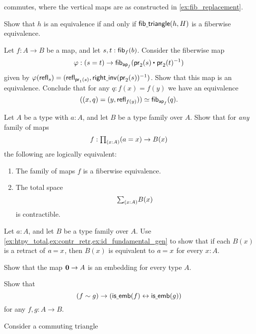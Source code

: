 \begin{exercises}
\begin{subexenum}
\begin{equation*}
\end{equation*}
commutes, where the vertical maps are as constructed in \cref{ex:fib_replacement}.
\item Show that $h$ is an equivalence if and only if $\mathsf{fib\underline{\ }{}triangle}(h,H)$ is a fiberwise equivalence.
\end{subexenum}
\item Let $f:A\to B$ be a map, and let $s,t : \mathsf{fib}_{f}(b)$. Consider the fiberwise map
\begin{equation*}
\varphi : (s=t)\to \fib{\apfunc{f}}{\ct{\proj 2(s)}{\proj 2(t)^{-1}}}
\end{equation*}
given by $\varphi(\mathsf{refl}_{s})=(\mathsf{refl}_{\mathsf{pr}_{1}(s)},\mathsf{right\underline{\ }{}inv}(\mathsf{pr}_{2}(s))^{-1})$. Show that this map is an equivalence. Conclude that for any $q:f(x)=f(y)$ we have an equivalence
\begin{equation*}
((x,q)=(y,\mathsf{refl}_{f(y)})) \simeq \mathsf{fib}_{\mathsf{ap}_{f}}(q).
\end{equation*}
\item \label{ex:id_fundamental_gen}Let $A$ be a type with $a:A$, and let $B$ be a type family over $A$. Show that for \emph{any} family of maps
\begin{equation*}
f:\prd{x:A} (a=x)\to B(x)
\end{equation*}
the following are logically equivalent:
\begin{enumerate}
\item The family of maps $f$ is a fiberwise equivalence.
\item The total space
\begin{equation*}
\sm{x:A}B(x)
\end{equation*}
is contractible.
\end{enumerate}
\item \label{ex:id_fundamental_retr}Let $a:A$, and let $B$ be a type family over $A$. Use \autoref{ex:htpy_total,ex:contr_retr,ex:id_fundamental_gen} to show that if each $B(x)$ is a retract of $\id{a}{x}$, then $B(x)$ is equivalent to $\id{a}{x}$ for every $x:A$.
\item Show that the map $\mathbf{0}\to A$ is an embedding for every type $A$.
\item Show that 
\begin{equation*}
(f\sim g)\to (\mathsf{is\underline{\ }{}emb}(f)\leftrightarrow\mathsf{is\underline{\ }{}emb}(g))
\end{equation*}
for any $f,g:A\to B$.
\item \label{ex:emb_triangle}Consider a commuting triangle
\begin{equation*}

\end{equation*}
\end{exercises}
